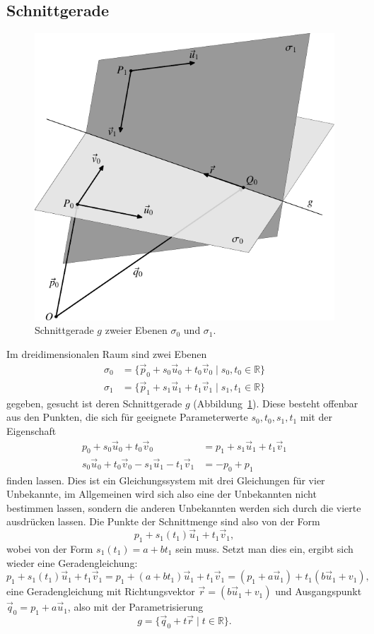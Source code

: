 \subsection{Schnittgerade}
\begin{figure}
\begin{center}
\includegraphics{images/v-10}
\end{center}
\caption{Schnittgerade $g$ zweier Ebenen $\sigma_0$ und $\sigma_1$.
\label{image-schnittgerade}}
\end{figure}
Im dreidimensionalen Raum sind zwei Ebenen
\begin{align*}
\sigma_0&=
\{\vec p_0+s_0\vec u_0+t_0\vec v_0\;|\;s_0, t_0\in\mathbb R\}
\\
\sigma_1&=
\{\vec p_1+s_1\vec u_1+t_1\vec v_1\;|\;s_1, t_1\in\mathbb R\}
\end{align*}
gegeben, gesucht ist deren Schnittgerade $g$
(Abbildung~\ref{image-schnittgerade}).
Diese besteht offenbar aus den Punkten, die sich für geeignete Parameterwerte
$s_0,t_0,s_1,t_1$ mit der Eigenschaft
\begin{align*}
p_0+s_0\vec u_0+t_0\vec v_0
&=
p_1+s_1\vec u_1+t_1\vec v_1
\\
s_0\vec u_0+t_0\vec v_0
-s_1\vec u_1-t_1\vec v_1
&=
-p_0+
p_1
\end{align*}
finden lassen.
Dies ist ein Gleichungssystem mit drei Gleichungen für
vier Unbekannte, im Allgemeinen wird sich also eine der Unbekannten
nicht bestimmen lassen, sondern die anderen Unbekannten werden sich
durch die vierte ausdrücken lassen.
Die Punkte der Schnittmenge sind also von der Form
\[
p_1+s_1(t_1)\vec u_1+t_1\vec v_1,
\]
wobei von der Form $s_1(t_1)=a+bt_1$ sein muss.
Setzt man dies ein, ergibt sich wieder eine Geradengleichung:
\[
p_1+s_1(t_1)\vec u_1+t_1\vec v_1
=
p_1+(a+bt_1)\vec u_1+t_1\vec v_1
=
(p_1+a\vec u_1)+t_1(b\vec u_1+v_1),
\]
eine Geradengleichung mit Richtungsvektor $\vec r = (b\vec u_1+v_1)$ und
Ausgangspunkt $\vec q_0=p_1+a\vec u_1$, also mit der Parametrisierung
\[
g=\{\vec q_0+t\vec r\;|\;t\in\mathbb R\}.
\]

